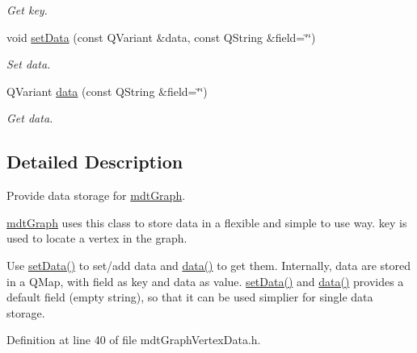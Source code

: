 \begin{DoxyCompactItemize}
\begin{DoxyCompactList}\small\item\em Get key. \end{DoxyCompactList}\item 
\hypertarget{classmdt_graph_vertex_data_aa35ae95a8bf98e15d5e048b4864204e5}{
void \hyperlink{classmdt_graph_vertex_data_aa35ae95a8bf98e15d5e048b4864204e5}{setData} (const QVariant \&data, const QString \&field=\char`\"{}\char`\"{})}
\label{classmdt_graph_vertex_data_aa35ae95a8bf98e15d5e048b4864204e5}

\begin{DoxyCompactList}\small\item\em Set data. \end{DoxyCompactList}\item 
QVariant \hyperlink{classmdt_graph_vertex_data_a0dc0684df335f14a8a401cf09d2ca4c2}{data} (const QString \&field=\char`\"{}\char`\"{})
\begin{DoxyCompactList}\small\item\em Get data. \end{DoxyCompactList}\end{DoxyCompactItemize}


\subsection{Detailed Description}
Provide data storage for \hyperlink{classmdt_graph}{mdtGraph}. 

\hyperlink{classmdt_graph}{mdtGraph} uses this class to store data in a flexible and simple to use way. key is used to locate a vertex in the graph.

Use \hyperlink{classmdt_graph_vertex_data_aa35ae95a8bf98e15d5e048b4864204e5}{setData()} to set/add data and \hyperlink{classmdt_graph_vertex_data_a0dc0684df335f14a8a401cf09d2ca4c2}{data()} to get them. Internally, data are stored in a QMap, with field as key and data as value. \hyperlink{classmdt_graph_vertex_data_aa35ae95a8bf98e15d5e048b4864204e5}{setData()} and \hyperlink{classmdt_graph_vertex_data_a0dc0684df335f14a8a401cf09d2ca4c2}{data()} provides a default field (empty string), so that it can be used simplier for single data storage. 

Definition at line 40 of file mdtGraphVertexData.h.



